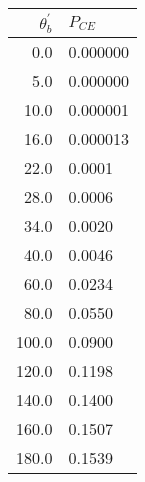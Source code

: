 \begin{tabular}{rl}
\hline
$\theta_b^{'}$ & $P_{CE}$   \\
\hline
  0.0          & 0.000000   \\
  5.0          & 0.000000   \\
 10.0          & 0.000001   \\
 16.0          & 0.000013   \\
 22.0          & 0.0001     \\
 28.0          & 0.0006     \\
 34.0          & 0.0020     \\
 40.0          & 0.0046     \\
 60.0          & 0.0234     \\
 80.0          & 0.0550     \\
100.0          & 0.0900     \\
120.0          & 0.1198     \\
140.0          & 0.1400     \\
160.0          & 0.1507     \\
180.0          & 0.1539     \\
\hline
\end{tabular}